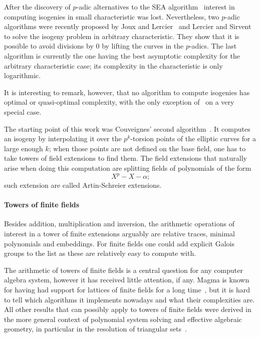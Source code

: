 After the discovery of $p$-adic alternatives to the SEA
algorithm~\cite{satoh00,fouquet+gaudry+harley00} interest in computing
isogenies in small characteristic was lost.  Nevertheless, two
$p$-adic algorithms were recently proposed by Joux and
Lercier~\cite{joux+lercier06} and Lercier and
Sirvent~\cite{lercier+sirvent08} to solve the isogeny problem in
arbitrary characteristic. They show that it is possible to avoid
divisions by $0$ by lifting the curves in the $p$-adics. The last
algorithm is currently the one having the best asymptotic complexity
for the arbitrary characteristic case; its complexity in the
characteristic is only logarithmic.

It is interesting to remark, however, that no algorithm to compute
isogenies has optimal or quasi-optimal complexity, with the only
exception of~\cite{bostan+morain+salvy+schost08} on a very special
case. 

The starting point of this work was Couveignes' second
algorithm~\cite{couveignes96}. It computes an isogeny by interpolating
it over the $p^k$-torsion points of the elliptic curves for a large
enough $k$; when those points are not defined on the base field, one
has to take towers of field extensions to find them. The field
extensions that naturally arise when doing this computation are
splitting fields of polynomials of the form
\[X^p - X -\alpha\text{;}\] such extension are called Artin-Schreier
extensions. 


\paragraph*{Towers of finite fields}
Besides addition, multiplication and inversion, the arithmetic
operations of interest in a tower of finite extensions arguably are
relative traces, minimal polynomials and embeddings. For finite fields
one could add explicit Galois groups to the list as these are
relatively easy to compute with.

The arithmetic of towers of finite fields is a central question for
any computer algebra system, however it has received little attention,
if any. Magma is known for having had support for lattices of finite
fields for a long time~\cite{bosma+cannon+steel97}, but it is hard to
tell which algorithms it implements nowadays and what their
complexities are. All other results that can possibly apply to towers
of finite fields were derived in the more general context of
polynomial system solving and effective algebraic geometry, in
particular in the resolution of triangular
sets~\cite{diaz+gonzalez01,giusti+lecerf+salvy01,bostan+salvy+schost03,pascal+schost06,li+moreno+schost07,dahan+jin+moreno+schost08,boulier+lemaire+moreno01,FGLM,rouiller99,alonso+becker+roy+wormann}.

